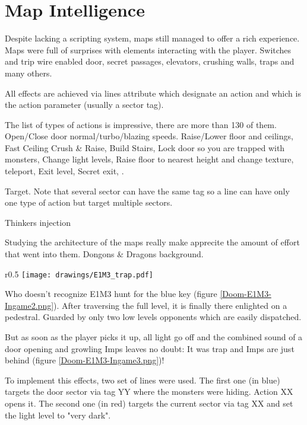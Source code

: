 \section{Map Intelligence}
Despite lacking a scripting system, maps still managed to offer a rich experience. Maps were full of surprises with elements interacting with the player. Switches and trip wire enabled door, secret passages, elevators, crushing walls, traps and many others.\\
\par
{}
\par
All effects are achieved via lines  attribute which designate an action and  which is the action parameter (usually a sector tag).\\
\par
The list of types of actions is impressive, there are more than 130 of them. Open/Close door normal/turbo/blazing speeds. Raise/Lower floor and ceilings, Fast Ceiling Crush \& Raise, Build Stairs, Lock door so you are trapped with monsters, Change light levels, Raise floor to nearest height and change texture, teleport, Exit level, Secret exit,  .\\
\par
Target. Note that several sector can have the same tag so a line can have only one type of action but target multiple sectors.\\
\par
Thinkers injection\\
\par
Studying the architecture of the maps really make apprecite the amount of effort that went into them. Dongons \& Dragons background.
\pagebreak






\begin{wrapfigure}[17]{r}{0.5\textwidth}
\centering
\texttt{[image: drawings/E1M3\_trap.pdf]}
\end{wrapfigure}
Who doesn't recognize E1M3 hunt for the blue key (figure \ref{Doom-E1M3-Ingame2.png}). After traversing the full level, it is finally there enlighted on a pedestral. Guarded by only two low levels opponents which are easily dispatched.\\
\par
But as soon as the player picks it up, all light go off and the combined sound of a door opening and growling Imps leaves no doubt: It was trap and Imps are just behind (figure \ref{Doom-E1M3-Ingame3.png})!\\
\par
To implement this effects, two set of lines were used. The first one (in blue) targets the door sector via tag YY where the monsters were hiding. Action XX opens it. The second one (in red) targets the current sector via tag XX and set the light level to "very dark".\\
\par
{}






